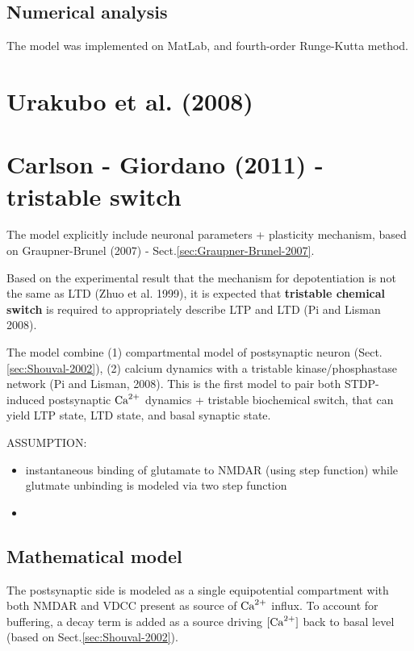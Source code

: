 \subsection{Numerical analysis}

The model was implemented on MatLab, and fourth-order Runge-Kutta method.

\section{Urakubo et al. (2008)}
\label{sec:Urakubo-2008}	


\section{Carlson - Giordano (2011) - tristable switch}
\label{sec:Carlson-Giordano-2011}

The model explicitly include neuronal parameters + plasticity mechanism, based
on Graupner-Brunel (2007) - Sect.\ref{sec:Graupner-Brunel-2007}.

Based on the experimental result that the mechanism for depotentiation is not
the same as LTD (Zhuo et al. 1999), it is expected that {\bf tristable chemical
switch} is required to appropriately describe LTP and LTD (Pi and Lisman 2008).

The model combine (1) compartmental model of postsynaptic neuron
(Sect.\ref{sec:Shouval-2002}), (2) calcium dynamics with a tristable
kinase/phosphastase network (Pi and Lisman, 2008).
This is the first model to pair both STDP-induced postsynaptic ${\text{Ca}^{2+}}$ dynamics +
tristable biochemical switch, that can yield LTP state, LTD state, and basal
synaptic state.

ASSUMPTION:
\begin{itemize}
  \item instantaneous binding of glutamate to NMDAR (using step function)
  while glutmate unbinding is modeled via two step function
  
  \item 
\end{itemize}

\subsection{Mathematical model}

The postsynaptic side is modeled as a single equipotential compartment with both
NMDAR and VDCC present as source of ${\text{Ca}^{2+}}$ influx.
To account for buffering, a decay term is added as a source driving $[{\text{Ca}^{2+}}]$ back
to basal level (based on Sect.\ref{sec:Shouval-2002}).


